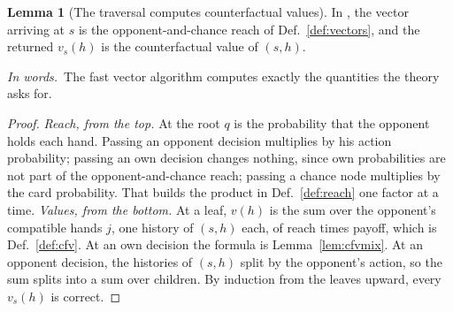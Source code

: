 \documentclass[11pt]{article}
\theoremstyle{definition}
\newtheorem{lemma}[definition]{Lemma}
\newcommand{\inwords}{\par\smallskip\noindent\textit{In words.}\ }
\newcommand{\Def}[1]{Def.~\ref{#1}}\newcommand{\Lem}[1]{Lemma~\ref{#1}}\newcommand{\Thm}[1]{Thm.~\ref{#1}}
\begin{document}
\begin{lemma}[The traversal computes counterfactual values]\label{lem:trav}
In , the vector arriving at $s$ is the opponent-and-chance reach of \Def{def:vectors}, and the returned
$v_s(h)$ is the counterfactual value of $(s,h)$.
\inwords The fast vector algorithm computes exactly the quantities the theory asks for.
\end{lemma}
\begin{proof}
\emph{Reach, from the top.} At the root $q$ is the probability that the opponent holds each hand. Passing an opponent
decision multiplies by his action probability; passing an own decision changes nothing, since own probabilities are not
part of the opponent-and-chance reach; passing a chance node multiplies by the card probability. That builds the product
in \Def{def:reach} one factor at a time. \emph{Values, from the bottom.} At a leaf, $v(h)$ is the sum over the opponent's
compatible hands $j$, one history of $(s,h)$ each, of reach times payoff, which is \Def{def:cfv}. At an own decision the
formula is \Lem{lem:cfvmix}. At an opponent decision, the histories of $(s,h)$ split by the opponent's action, so the sum
splits into a sum over children. By induction from the leaves upward, every $v_s(h)$ is correct.
\end{proof}
\end{document}
